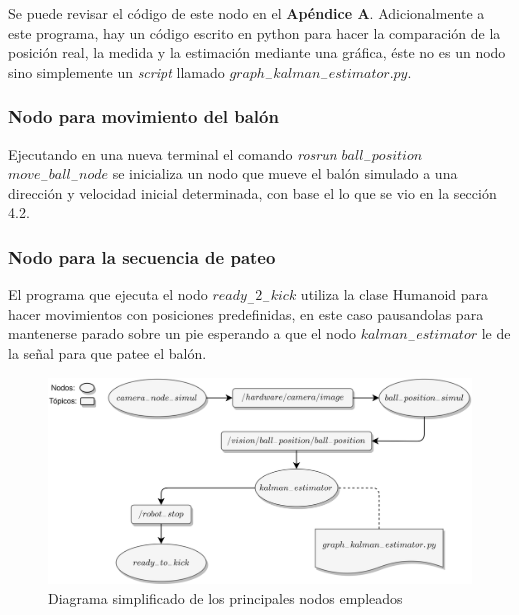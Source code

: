 			Se puede revisar el código de este nodo en el \textbf{Apéndice A}.
	Adicionalmente a este programa, hay un código escrito en python para hacer la comparación de la posición real, la medida y la estimación mediante una gráfica, éste no es un nodo sino simplemente un \textit{script} llamado $graph_-kalman_-estimator.py$.
			
			\subsubsection*{Nodo para movimiento del balón}
			Ejecutando en una nueva terminal el comando \textit{rosrun $ball_-position$ $move_-ball_-node$} se inicializa un nodo que mueve el balón simulado a una dirección y velocidad inicial determinada, con base el lo que se vio en la sección 4.2. 
			
			\subsubsection*{Nodo para la secuencia de pateo} 
			El programa que ejecuta el nodo \textit{$ready_-2_-kick$} utiliza la clase Humanoid para hacer movimientos con posiciones predefinidas, en este caso pausandolas para mantenerse parado sobre un pie esperando a que el nodo $kalman_-estimator$ le de la señal para que patee el balón.
		
		
\begin{figure}
	\centering
	\includegraphics[scale=0.071]{images/nodes_diagram.png}
	\caption{Diagrama simplificado de los principales nodos empleados}
	\label{fig:nodes_diagram}
\end{figure}
		
